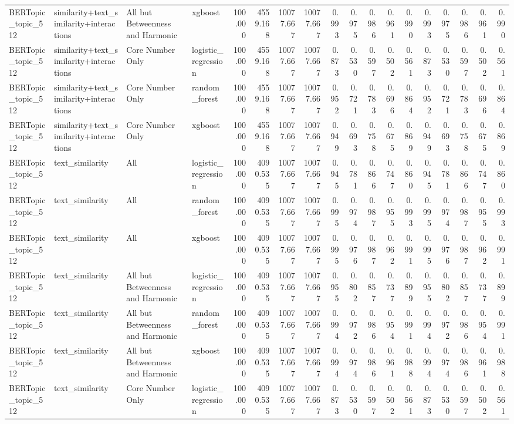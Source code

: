 \begin{tabular}{llllrrrrrrrrrrrrrr}
BERTopic_topic_512 & similarity+text_similarity+interactions & All but Betweenness and Harmonic & xgboost & 100.000 & 4559.168 & 10077.667 & 10077.667 & 0.993 & 0.975 & 0.986 & 0.961 & 0.990 & 0.993 & 0.975 & 0.986 & 0.961 & 0.990 \\
BERTopic_topic_512 & similarity+text_similarity+interactions & Core Number Only & logistic_regression & 100.000 & 4559.168 & 10077.667 & 10077.667 & 0.873 & 0.530 & 0.597 & 0.502 & 0.561 & 0.873 & 0.530 & 0.597 & 0.502 & 0.561 \\
BERTopic_topic_512 & similarity+text_similarity+interactions & Core Number Only & random_forest & 100.000 & 4559.168 & 10077.667 & 10077.667 & 0.952 & 0.721 & 0.783 & 0.696 & 0.864 & 0.952 & 0.721 & 0.783 & 0.696 & 0.864 \\
BERTopic_topic_512 & similarity+text_similarity+interactions & Core Number Only & xgboost & 100.000 & 4559.168 & 10077.667 & 10077.667 & 0.949 & 0.693 & 0.758 & 0.675 & 0.869 & 0.949 & 0.693 & 0.758 & 0.675 & 0.869 \\
BERTopic_topic_512 & text_similarity & All & logistic_regression & 100.000 & 4090.535 & 10077.667 & 10077.667 & 0.945 & 0.781 & 0.866 & 0.747 & 0.860 & 0.945 & 0.781 & 0.866 & 0.747 & 0.860 \\
BERTopic_topic_512 & text_similarity & All & random_forest & 100.000 & 4090.535 & 10077.667 & 10077.667 & 0.995 & 0.974 & 0.987 & 0.955 & 0.993 & 0.995 & 0.974 & 0.987 & 0.955 & 0.993 \\
BERTopic_topic_512 & text_similarity & All & xgboost & 100.000 & 4090.535 & 10077.667 & 10077.667 & 0.995 & 0.976 & 0.987 & 0.962 & 0.991 & 0.995 & 0.976 & 0.987 & 0.962 & 0.991 \\
BERTopic_topic_512 & text_similarity & All but Betweenness and Harmonic & logistic_regression & 100.000 & 4090.535 & 10077.667 & 10077.667 & 0.955 & 0.802 & 0.857 & 0.737 & 0.899 & 0.955 & 0.802 & 0.857 & 0.737 & 0.899 \\
BERTopic_topic_512 & text_similarity & All but Betweenness and Harmonic & random_forest & 100.000 & 4090.535 & 10077.667 & 10077.667 & 0.994 & 0.972 & 0.986 & 0.954 & 0.991 & 0.994 & 0.972 & 0.986 & 0.954 & 0.991 \\
BERTopic_topic_512 & text_similarity & All but Betweenness and Harmonic & xgboost & 100.000 & 4090.535 & 10077.667 & 10077.667 & 0.994 & 0.974 & 0.986 & 0.961 & 0.988 & 0.994 & 0.974 & 0.986 & 0.961 & 0.988 \\
BERTopic_topic_512 & text_similarity & Core Number Only & logistic_regression & 100.000 & 4090.535 & 10077.667 & 10077.667 & 0.873 & 0.530 & 0.597 & 0.502 & 0.561 & 0.873 & 0.530 & 0.597 & 0.502 & 0.561 \\

\end{tabular}

